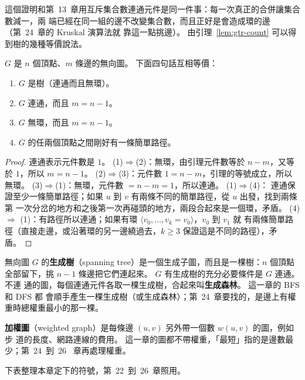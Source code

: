 這個證明和第~13~章用互斥集合數連通元件是同一件事：每一次真正的合併讓集合數減一，兩
端已經在同一組的邊不改變集合數，而且正好是會造成環的邊（第~24~章的 Kruskal 演算法就
靠這一點挑邊）。 由引理~\ref{lem:gtr-count} 可以得到樹的幾種等價說法。

\begin{theorem}
\label{thm:gtr-tree}
$G$ 是 $n$ 個頂點、$m$ 條邊的無向圖。 下面四句話互相等價：
\begin{enumerate}
\item $G$ 是樹（連通而且無環）。
\item $G$ 連通，而且 $m = n - 1$。
\item $G$ 無環，而且 $m = n - 1$。
\item $G$ 的任兩個頂點之間剛好有一條簡單路徑。
\end{enumerate}
\end{theorem}

\begin{proof}
連通表示元件數是 $1$。 (1)$\Rightarrow$(2)：無環，由引理元件數等於 $n - m$，又等於
$1$，所以 $m = n - 1$。 (2)$\Rightarrow$(3)：元件數 $1 = n - m$，引理的等號成立，所以
無環。 (3)$\Rightarrow$(1)：無環，元件數 $= n - m = 1$，所以連通。 (1)$\Rightarrow$(4)：
連通保證至少一條簡單路徑；如果 $u$ 到 $v$ 有兩條不同的簡單路徑，從 $u$ 出發，找到兩條第
一次分岔的地方和之後第一次再碰頭的地方，兩段合起來是一個環，矛盾。 (4)$\Rightarrow$
(1)：有路徑所以連通；如果有環 $\langle v_0, \ldots, v_k = v_0 \rangle$，$v_0$ 到 $v_1$ 就
有兩條簡單路徑（直接走邊，或沿著環的另一邊繞過去，$k \ge 3$ 保證這是不同的路徑），矛
盾。
\end{proof}

無向圖 $G$ 的\textbf{生成樹}（spanning tree）是一個生成子圖，而且是一棵樹：$n$ 個頂點
全部留下，挑 $n - 1$ 條邊把它們連起來。 $G$ 有生成樹的充分必要條件是 $G$ 連通。 不連
通的圖，每個連通元件各取一棵生成樹，合起來叫\textbf{生成森林}。 這一章的 BFS 和 DFS 都
會順手產生一棵生成樹（或生成森林）；第~24~章要找的，是邊上有權重時總權重最小的那一棵。

\textbf{加權圖}（weighted graph）是每條邊 $(u, v)$ 另外帶一個數 $w(u, v)$ 的圖，例如步
道的長度、網路連線的費用。 這一章的圖都不帶權重，「最短」指的是邊數最少；第~24~到~26~
章再處理權重。

下表整理本章定下的符號，第~22~到~26~章照用。

